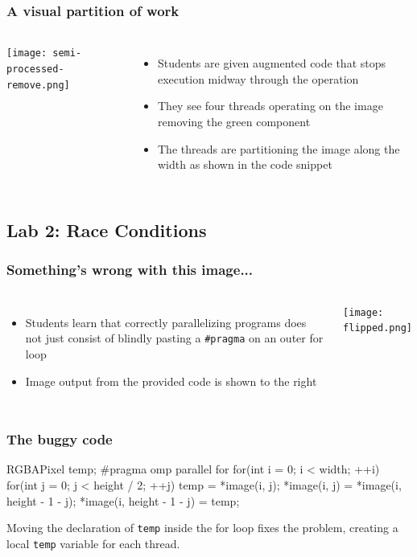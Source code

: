 \documentclass[table]{beamer}
\begin{document}
\begin{frame}
    \frametitle{A visual partition of work}
    \begin{columns}
        \texttt{[image: semi-processed-remove.png]}
        \begin{itemize}
        \item Students are given augmented code that stops execution midway
            through the operation
        \item They see four threads operating on the
            image removing the green component
        \item The threads are partitioning the image along the width as
            shown in the code snippet
        \end{itemize}
    \end{columns}
\end{frame}

\subsection{Lab 2: Race Conditions}

\begin{frame}[fragile]
    \frametitle{Something's wrong with this image...}
    \begin{columns}
        \begin{itemize}
            \item Students learn that correctly parallelizing
            programs does not just consist of blindly pasting a
            \verb|#pragma| on an outer for loop
            \item Image output from the provided code is shown to the right
        \end{itemize}
        \texttt{[image: flipped.png]}
    \end{columns}
\end{frame}

\begin{frame}[fragile]
    \frametitle{The buggy code}
        \begin{cppcode}
RGBAPixel temp;
#pragma omp parallel for
for(int i = 0; i < width; ++i)
{
   for(int j = 0; j < height / 2; ++j)
   {
      temp = *image(i, j);
      *image(i, j) = *image(i, height - 1 - j);
      *image(i, height - 1 - j) = temp;
   }
}
        \end{cppcode}
        Moving the declaration of \verb|temp| inside the for loop
        fixes the problem, creating a local \verb|temp| variable for each
        thread.
\end{frame}
\end{document}
